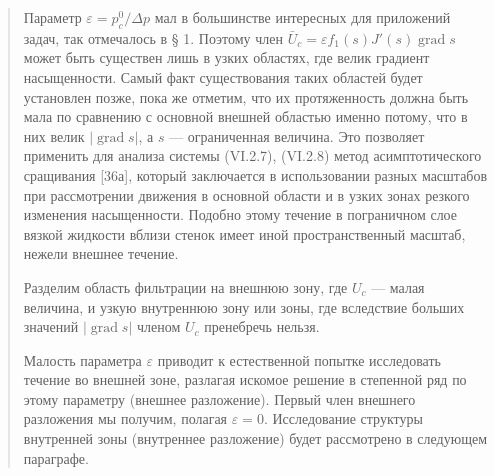 \documentclass[12pt,a4paper]{article}
\DeclareMathOperator{\grad}{grad}
\begin{document}
\begin{quote}\sloppy
Параметр $\varepsilon=p_c^0/\Delta p$ мал в большинстве интересных для приложений задач, так отмечалось в § 1. Поэтому член $\bar U_c=\varepsilon f_1(s)J'(s)\grad s$ может быть существен лишь в узких областях, где велик градиент насыщенности. Самый факт существования таких областей будет установлен позже, пока же отметим, что их протяженность должна быть мала по сравнению с основной внешней областью именно потому, что в них велик $|\grad s|$, а $s$ --- ограниченная величина. Это позволяет применить для анализа системы (VI.2.7), (VI.2.8) метод асимптотического сращивания [36а], который заключается в использовании разных масштабов при рассмотрении движения в основной области и в узких зонах резкого изменения насыщенности. Подобно этому течение в пограничном слое вязкой жидкости вблизи стенок имеет иной пространственный масштаб, нежели внешнее течение.

Разделим область фильтрации на внешнюю зону, где $U_c$ --- малая величина, и узкую внутреннюю зону или зоны, где вследствие больших значений $|\grad s|$ членом $U_c$ пренебречь нельзя.

Малость параметра $\varepsilon$ приводит к естественной попытке исследовать течение во внешней зоне, разлагая искомое решение в степенной ряд по этому параметру (внешнее разложение). Первый член внешнего разложения мы получим, полагая $\varepsilon=0$. Исследование структуры внутренней зоны (внутреннее разложение) будет рассмотрено в следующем параграфе.
\par\nobreak{}\par
\end{quote}
\end{document}
